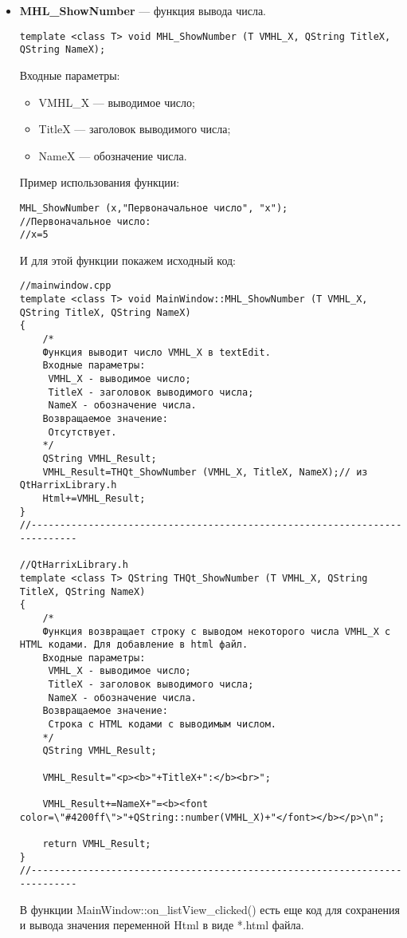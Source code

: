\begin{itemize}
\item \textbf{MHL\_ShowNumber} --- функция вывода числа. 
\begin{lstlisting}[label=examplefunction13, caption=Синтаксис функции MHL\_ShowNumber]
template <class T> void MHL_ShowNumber (T VMHL_X, QString TitleX, QString NameX);
\end{lstlisting}
Входные параметры: 
\begin{itemize}   
    \item  VMHL\_X --- выводимое число;
     \item TitleX --- заголовок выводимого числа;
     \item NameX --- обозначение числа.
\end{itemize}
Пример использования функции:
\begin{lstlisting}[label=examplefunction10, caption=Пример использования MHL\_ShowNumber]
MHL_ShowNumber (x,"Первоначальное число", "x");
//Первоначальное число:
//x=5
\end{lstlisting}
И для этой функции покажем исходный код:
\begin{lstlisting}[label=examplefunction11, caption=Реализация функции MHL\_ShowNumber]
//mainwindow.cpp
template <class T> void MainWindow::MHL_ShowNumber (T VMHL_X, QString TitleX, QString NameX)
{
    /*
    Функция выводит число VMHL_X в textEdit.
    Входные параметры:
     VMHL_X - выводимое число;
     TitleX - заголовок выводимого числа;
     NameX - обозначение числа.
    Возвращаемое значение:
     Отсутствует.
    */
    QString VMHL_Result;
    VMHL_Result=THQt_ShowNumber (VMHL_X, TitleX, NameX);// из QtHarrixLibrary.h
    Html+=VMHL_Result;
}
//---------------------------------------------------------------------------

//QtHarrixLibrary.h
template <class T> QString THQt_ShowNumber (T VMHL_X, QString TitleX, QString NameX)
{
    /*
    Функция возвращает строку с выводом некоторого числа VMHL_X с HTML кодами. Для добавление в html файл.
    Входные параметры:
     VMHL_X - выводимое число;
     TitleX - заголовок выводимого числа;
     NameX - обозначение числа.
    Возвращаемое значение:
     Строка с HTML кодами с выводимым числом.
    */
    QString VMHL_Result;

    VMHL_Result="<p><b>"+TitleX+":</b><br>";

    VMHL_Result+=NameX+"=<b><font color=\"#4200ff\">"+QString::number(VMHL_X)+"</font></b></p>\n";

    return VMHL_Result;
}
//---------------------------------------------------------------------------
\end{lstlisting}
В функции MainWindow::on\_listView\_clicked() есть еще код для сохранения и вывода значения переменной Html в виде *.html файла.


\end{itemize}
